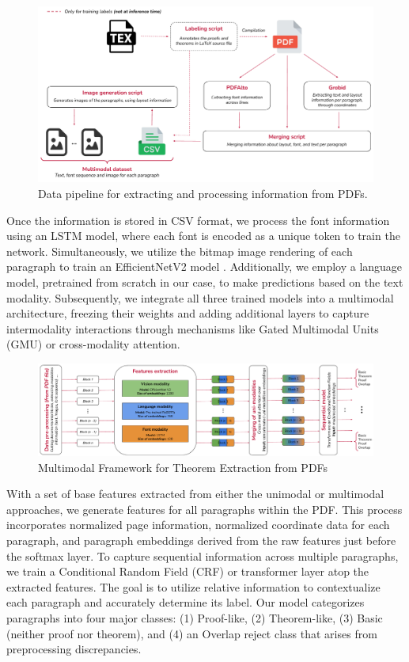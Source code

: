 \documentclass[runningheads]{llncs}
\begin{document}
\begin{figure}[h]
    \centering
    \includegraphics[width=\textwidth]{images/preprocessing.pdf}
    \caption{Data pipeline for extracting and processing information from PDFs.}
    \label{fig:datapipeline}
\end{figure}

Once the information is stored in CSV format, we process the font information using an LSTM model, where 
each font is encoded as a unique token to train the network. Simultaneously, we utilize the bitmap image 
rendering of each paragraph to train an EfficientNetV2 model \cite{efficientnet}. Additionally, we employ a language model, 
pretrained from scratch in our case, to make predictions based on the text modality. Subsequently, we 
integrate all three trained models into a multimodal architecture, freezing their weights and adding 
additional layers to capture intermodality interactions through mechanisms like Gated Multimodal Units 
(GMU) or cross-modality attention.

\begin{figure}[h]
    \centering
    \includegraphics[width=\textwidth]{images/general_pipeline.pdf}
    \caption{Multimodal Framework for Theorem Extraction from PDFs}
    \label{fig:generalpipeline}
\end{figure}


With a set of base features extracted from either the unimodal or multimodal approaches, we generate 
features for all paragraphs within the PDF. This process incorporates normalized page information, 
normalized coordinate data for each paragraph, and paragraph embeddings derived from the raw features 
just before the softmax layer. To capture sequential information across multiple paragraphs, we train a 
Conditional Random Field (CRF) or transformer layer atop the extracted features. The goal is to utilize 
relative information to contextualize each paragraph and accurately determine its label. Our model 
categorizes paragraphs into four major classes: (1) Proof-like, (2) Theorem-like, (3) Basic (neither 
proof nor theorem), and (4) an Overlap reject class that arises from preprocessing discrepancies.
\end{document}
